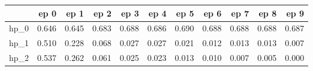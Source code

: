 \begin{tabular}{lrrrrrrrrrr}
\toprule
{} &   ep 0 &   ep 1 &   ep 2 &   ep 3 &   ep 4 &   ep 5 &   ep 6 &   ep 7 &   ep 8 &   ep 9 \\
\midrule
hp\_0 &  0.646 &  0.645 &  0.683 &  0.688 &  0.686 &  0.690 &  0.688 &  0.688 &  0.688 &  0.687 \\
hp\_1 &  0.510 &  0.228 &  0.068 &  0.027 &  0.027 &  0.021 &  0.012 &  0.013 &  0.013 &  0.007 \\
hp\_2 &  0.537 &  0.262 &  0.061 &  0.025 &  0.023 &  0.013 &  0.010 &  0.007 &  0.005 &  0.000 \\
\bottomrule
\end{tabular}
